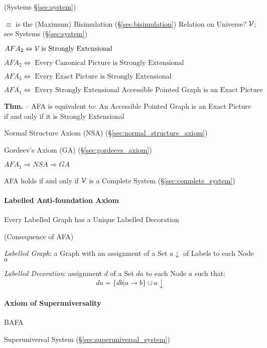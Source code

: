 (Systems \S\ref{sec:system})

$\equiv$ is the (Maximum) Bisimulation (\S\ref{sec:bisimulation}) Relation on
Universe? $\mathcal{V}$; see Systems (\S\ref{sec:system})

$AFA_2 \Leftrightarrow \mathcal{V} \;\text{is Strongly Extensional}$

$AFA_2 \Leftrightarrow \;\text{Every Canonical Picture is Strongly
  Extensional}$

$AFA_2 \Leftrightarrow \;\text{Every Exact Picture is Strongly
  Extensional}$

$AFA_1 \Leftrightarrow \;\text{Every Strongly Extensional Accessible
  Pointed Graph is an Exact Picture}$

\textbf{Thm.} -- AFA is equivalent to: An Accessible Pointed Graph is
an Exact Picture if and only if it is Strongly Extensional

Normal Structure Axiom (NSA) (\S\ref{sec:normal_structure_axiom})

Gordeev's Axiom (GA) (\S\ref{sec:gordeevs_axiom})

$AFA_1 \Rightarrow NSA \Rightarrow GA$

AFA holds if and only if $\mathcal{V}$ is a Complete System
(\S\ref{sec:complete_system})



\paragraph{Labelled Anti-foundation Axiom}
\label{sec:labelled_antifoundation}\hfill

\cite{aczel88}

Every Labelled Graph has a Unique Labelled Decoration

(Consequence of AFA)

\emph{Labelled Graph}: a Graph with an assignment of a Set
$a\downarrow$ of Labels to each Node $a$

\emph{Labelled Decoration}: assignment $d$ of a Set $d a$ to each Node
$a$ such that:
\[
  da = \{db | a \rightarrow b\} \cup a \downarrow
\]



\paragraph{Axiom of Superuniversality}
\label{sec:superuniversality_axiom}\hfill

BAFA

Superuniversal System (\S\ref{sec:superuniversal_system})


